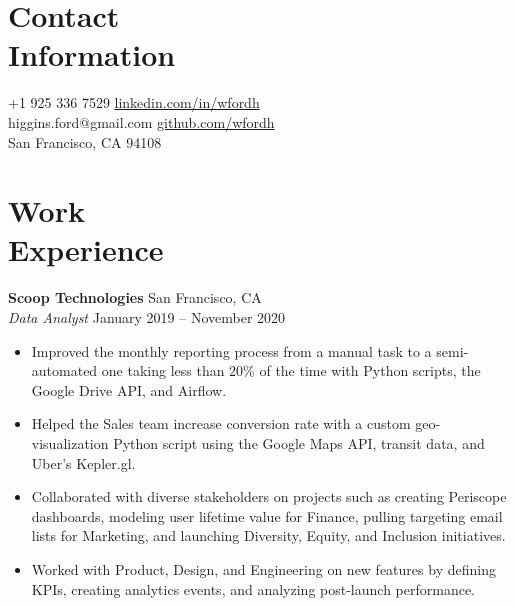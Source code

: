 \documentclass[line, margin]{res}
\begin{document}

\begin{resume}
	
	
\section{Contact \\ Information}
	+1 925 336 7529       \hfill \href{https://linkedin.com/in/wfordh/}{linkedin.com/in/wfordh} \\
	\noindent higgins.ford@gmail.com  \hfill \href{https://github.com/wfordh}{github.com/wfordh} \\
	\noindent San Francisco, CA 94108
	

\section{Work\\Experience}
	\textbf{Scoop Technologies} \hfill{San Francisco, CA} \vspace{1 mm}\\\vspace{0.5mm}%
	\textsl{Data Analyst} \hfill{January 2019 -- November 2020}\
	\begin{itemize}
		\item Improved the monthly reporting process from a manual task to a semi-automated one taking less than 20\% of the time with Python scripts, the Google Drive API, and Airflow.
		\item Helped the Sales team increase conversion rate with a custom geo-visualization Python script using the Google Maps API, transit data, and Uber's Kepler.gl.
		\item Collaborated with diverse stakeholders on projects such as creating Periscope dashboards, modeling user lifetime value for Finance, pulling targeting email lists for Marketing, and launching Diversity, Equity, and Inclusion initiatives.
		\item Worked with Product, Design, and Engineering on new features by defining KPIs, creating analytics events, and analyzing post-launch performance.
	\end{itemize}\
	

\end{resume}
\end{document}
